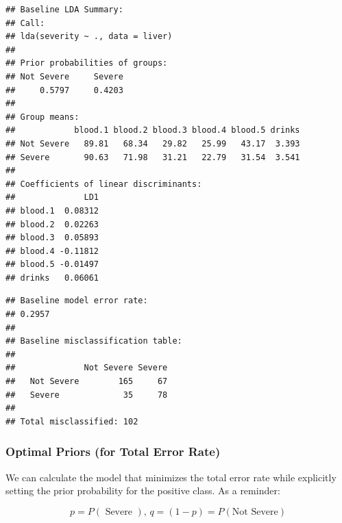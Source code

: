 \documentclass[
  11pt,
  a4paper,
]{scrartcl}
\newenvironment{Shaded}{\begin{snugshade}}{\end{snugshade}}
\newcommand{\AttributeTok}[1]{\textcolor[rgb]{0.77,0.63,0.00}{#1}}
\newcommand{\CommentTok}[1]{\textcolor[rgb]{0.56,0.35,0.01}{\textit{#1}}}
\newcommand{\ConstantTok}[1]{\textcolor[rgb]{0.00,0.00,0.00}{#1}}
\newcommand{\DecValTok}[1]{\textcolor[rgb]{0.00,0.00,0.81}{#1}}
\newcommand{\FloatTok}[1]{\textcolor[rgb]{0.00,0.00,0.81}{#1}}
\newcommand{\FunctionTok}[1]{\textcolor[rgb]{0.00,0.00,0.00}{#1}}
\newcommand{\NormalTok}[1]{#1}
\newcommand{\OtherTok}[1]{\textcolor[rgb]{0.56,0.35,0.01}{#1}}
\newcommand{\SpecialCharTok}[1]{\textcolor[rgb]{0.00,0.00,0.00}{#1}}
\begin{document}
\begin{verbatim}
## Baseline LDA Summary:
## Call:
## lda(severity ~ ., data = liver)
## 
## Prior probabilities of groups:
## Not Severe     Severe 
##     0.5797     0.4203 
## 
## Group means:
##            blood.1 blood.2 blood.3 blood.4 blood.5 drinks
## Not Severe   89.81   68.34   29.82   25.99   43.17  3.393
## Severe       90.63   71.98   31.21   22.79   31.54  3.541
## 
## Coefficients of linear discriminants:
##              LD1
## blood.1  0.08312
## blood.2  0.02263
## blood.3  0.05893
## blood.4 -0.11812
## blood.5 -0.01497
## drinks   0.06061
\end{verbatim}

\begin{verbatim}
## Baseline model error rate:
## 0.2957
## 
## Baseline misclassification table:
##             
##              Not Severe Severe
##   Not Severe        165     67
##   Severe             35     78
## 
## Total misclassified: 102
\end{verbatim}

\hypertarget{optimal-priors-for-total-error-rate}{%
\subsubsection{Optimal Priors (for Total Error
Rate)}\label{optimal-priors-for-total-error-rate}}

We can calculate the model that minimizes the total error rate while
explicitly setting the prior probability for the positive class. As a
reminder:

\[
p = P(\text{ Severe }),\, q = (1 - p) = P(\text{Not Severe})
\]

\begin{Shaded}
\end{Shaded}
\end{document}
